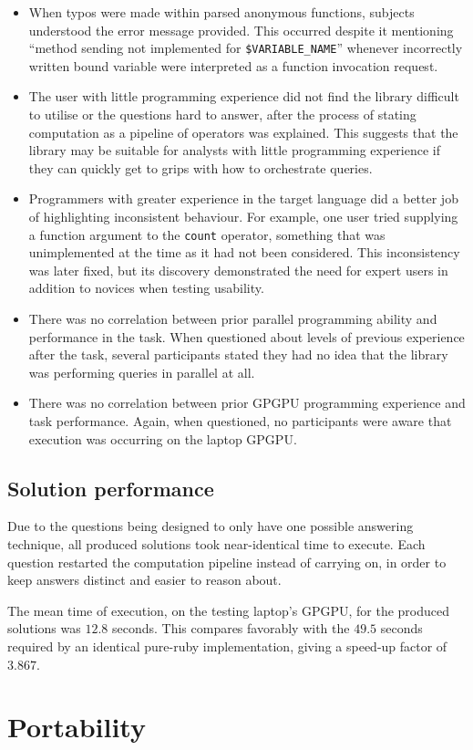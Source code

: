 \begin{itemize}
  \item  When typos were made within parsed anonymous functions, subjects understood the error message provided. This occurred despite it mentioning ``method sending not implemented for \verb|$VARIABLE_NAME|'' whenever incorrectly written bound variable were interpreted as a function invocation request.

  \item The user with little programming experience did not find the library difficult to utilise or the questions hard to answer, after the process of stating computation as a pipeline of operators was explained. This suggests that the library may be suitable for analysts with little programming experience if they can quickly get to grips with how to orchestrate queries.

  \item Programmers with greater experience in the target language did a better job of highlighting inconsistent behaviour. For example, one user tried supplying a function argument to the \verb|count| operator, something that was unimplemented at the time as it had not been considered. This inconsistency was later fixed, but its discovery demonstrated the need for expert users in addition to novices when testing usability.

  \item There was no correlation between prior parallel programming ability and performance in the task. When questioned about levels of previous experience after the task, several participants stated they had no idea that the library was performing queries in parallel at all.

  \item There was no correlation between prior \ac{GPGPU} programming experience and task performance. Again, when questioned, no participants were aware that execution was occurring on the laptop \ac{GPGPU}.

\end{itemize}

\subsection{Solution performance}
Due to the questions being designed to only have one possible answering technique, all produced solutions took near-identical time to execute.
Each question restarted the computation pipeline instead of carrying on, in order to keep answers distinct and easier to reason about.

The mean time of execution, on the testing laptop's \ac{GPGPU}, for the produced solutions was $12.8$ seconds.
This compares favorably with the $49.5$ seconds required by an identical pure-ruby implementation, giving a speed-up factor of $3.867$.

\section{Portability}
